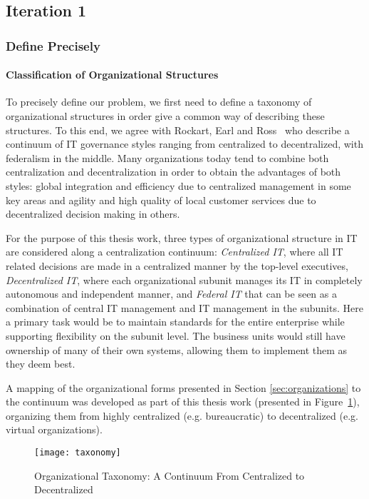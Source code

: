 \subsection{Iteration 1}

\subsubsection{Define Precisely}

\paragraph*{Classification of Organizational Structures}

To precisely define our problem, we first need to define a taxonomy of organizational structures in order give a common way of describing these structures. To this end, we agree with Rockart, Earl and Ross~\cite{Rockart1996} who describe a continuum of IT governance styles ranging from centralized to decentralized, with federalism in the middle. Many organizations today tend to combine both centralization and decentralization in order to obtain the advantages of both styles: global integration and efficiency due to centralized management in some key areas and agility and high quality of local customer services due to decentralized decision making in others. 

For the purpose of this thesis work, three types of organizational structure in IT are considered along a centralization continuum: \textit{Centralized IT}, where all IT related decisions are made in a centralized manner by the top-level executives, \textit{Decentralized IT}, where each organizational subunit manages its IT in completely autonomous and independent manner,  and \textit{Federal IT} that can be seen as a combination of central IT management and IT management in the subunits. Here a primary task  would be to maintain standards for the entire enterprise while supporting flexibility on the subunit level. The business units would still have ownership of many of their own systems, allowing them to implement them as they deem best. 

A mapping of the organizational forms presented in Section \ref{sec:organizations} to the continuum was developed as part of this thesis work (presented in Figure~\ref{fig:taxonomy}), organizing them from highly centralized (e.g. bureaucratic) to decentralized (e.g. virtual organizations).

\begin{figure}
\centering
\texttt{[image: taxonomy]}
\caption{Organizational Taxonomy: A Continuum From Centralized to Decentralized}
\label{fig:taxonomy}
\end{figure}

